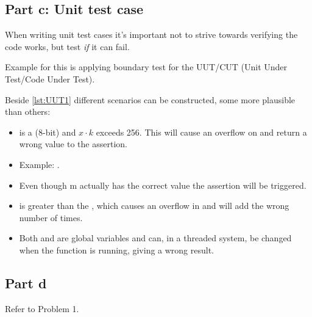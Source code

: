 \documentclass[Main_Assignment4]{subfiles}
\begin{document}
\subsection{Part c: Unit test case}
When writing unit test cases it's important not to strive towards verifying the code works, but test \emph{if} it can fail.

Example for this is applying boundary test for the UUT/CUT (Unit Under Test/Code Under Test). 




Beside \codeTitle \ref{lst:UUT1} different scenarios can be constructed, some more plausible than others:
\begin{itemize}
	\item {}  is a  (8-bit) and $x \cdot k$ exceeds 256. This will cause an overflow on  and return a wrong value to the assertion.
	\item[] Example: .
	\item[] Even though m actually has the correct value the assertion will be triggered.

	\item {} is greater than the , which causes an overflow in  and will add  the wrong number of times.

	\item Both  and  are global variables and can, in a threaded system, be changed when the function is running, giving a wrong result.
\end{itemize}

\subsection{Part d}
Refer to Problem 1.
\end{document}
